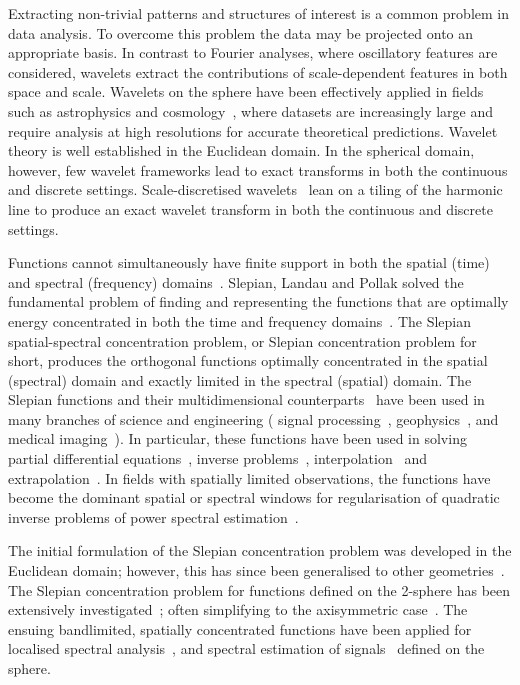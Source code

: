 Extracting non-trivial patterns and structures of interest is a common problem in data analysis.
To overcome this problem the data may be projected onto an appropriate basis.
In contrast to Fourier analyses, where oscillatory features are considered, wavelets extract the contributions of scale-dependent features in both space and scale.
Wavelets on the sphere have been effectively applied in fields such as astrophysics and cosmology~\cite{Pen1999,Barreiro2001,Rocha2004,McEwen2004}, where datasets are increasingly large and require analysis at high resolutions for accurate theoretical predictions.
Wavelet theory is well established in the Euclidean domain.
In the spherical domain, however, few wavelet frameworks lead to exact transforms in both the continuous and discrete settings.
Scale-discretised wavelets~\cite{Wiaux2008,McEwen2018,Leistedt2013,McEwen2013,McEwen2015} lean on a tiling of the harmonic line to produce an exact wavelet transform in both the continuous and discrete settings.

Functions cannot simultaneously have finite support in both the spatial (time) and spectral (frequency) domains~\cite{Slepian1961,Slepian1983}.
Slepian, Landau and Pollak solved the fundamental problem of finding and representing the functions that are optimally energy concentrated in both the time and frequency domains~\cite{Slepian1961,Landau1961,Landau1962}.
The Slepian spatial-spectral concentration problem, or Slepian concentration problem for short, produces the orthogonal functions optimally concentrated in the spatial (spectral) domain and exactly limited in the spectral (spatial) domain.
The Slepian functions and their multidimensional counterparts~\cite{Slepian1964,Simons2011a} have been used in many branches of science and engineering (\eg{} signal processing~\cite{Mathews1985,Thomson1982}, geophysics~\cite{Thomson1976,Simons2006a,Simons2011}, and medical imaging~\cite{Jackson1991}).
In particular, these functions have been used in solving partial differential equations~\cite{Boyd2003,Chen2005}, inverse problems~\cite{Villiers2001,Abdelmoula2015}, interpolation~\cite{Moore2004,Shkolnisky2006} and extrapolation~\cite{Xu1983}.
In fields with spatially limited observations, the functions have become the dominant spatial or spectral windows for regularisation of quadratic inverse problems of power spectral estimation~\cite{Thomson1976}.

The initial formulation of the Slepian concentration problem was developed in the Euclidean domain; however, this has since been generalised to other geometries~\cite{Simons2006,Wieczorek2005,Albertella1999,Cohen1989,Meaney1984,Daubechies1988}.
The Slepian concentration problem for functions defined on the 2-sphere has been extensively investigated~\cite{Simons2006,Wieczorek2005,Albertella1999}; often simplifying to the axisymmetric case~\cite{Simons2006a,Simons2007}.
The ensuing bandlimited, spatially concentrated functions have been applied for localised spectral analysis~\cite{Wieczorek2005}, and spectral estimation of signals~\cite{Wieczorek2007} defined on the sphere.

